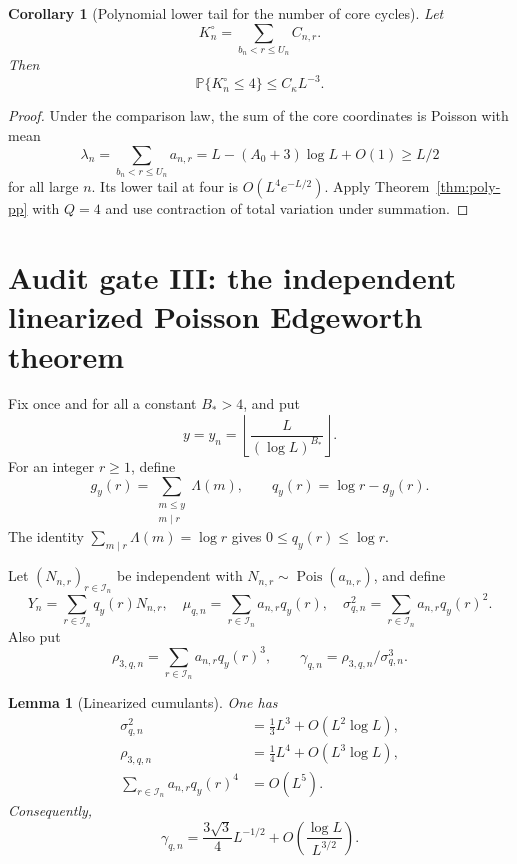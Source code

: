 \documentclass[11pt]{article}
\newtheorem{lemma}[theorem]{Lemma}
\newtheorem{corollary}[theorem]{Corollary}
\theoremstyle{remark}
\newcommand{\Pp}{\mathbb P}
\newcommand{\Pois}{\operatorname{Pois}}
\begin{document}
\begin{corollary}[Polynomial lower tail for the number of core cycles]
\label{cor:core-lower-tail}
Let
\[
 K_n^\circ=\sum_{b_n<r\le U_n}C_{n,r}.
\]
Then
\[
 \Pp\{K_n^\circ\le4\}\le C_\kappa L^{-3}.
\]
\end{corollary}

\begin{proof}
Under the comparison law, the sum of the core coordinates is Poisson with
mean
\[
 \lambda_n=\sum_{b_n<r\le U_n}a_{n,r}
 =L-(A_0+3)\log L+O(1)\ge L/2
\]
for all large $n$.  Its lower tail at four is $O(L^4e^{-L/2})$.  Apply
Theorem~\ref{thm:poly-pp} with $Q=4$ and use contraction of total variation
under summation.
\end{proof}

\section{Audit gate III: the independent linearized Poisson Edgeworth theorem}
\label{sec:poisson-edgeworth}

Fix once and for all a constant $B_*>4$, and put
\[
 y=y_n=\left\lfloor\frac{L}{(\log L)^{B_*}}\right\rfloor.
\]
For an integer $r\ge1$, define
\[
 g_y(r)=\sum_{\substack{m\le y\\m\mid r}}\Lambda(m),
 \qquad
 q_y(r)=\log r-g_y(r).
\]
The identity $\sum_{m\mid r}\Lambda(m)=\log r$ gives
$0\le q_y(r)\le\log r$.

Let $(N_{n,r})_{r\in\mathcal I_n}$ be independent with
$N_{n,r}\sim\Pois(a_{n,r})$, and define
\[
 Y_n=\sum_{r\in\mathcal I_n}q_y(r)N_{n,r},
 \quad
 \mu_{q,n}=\sum_{r\in\mathcal I_n}a_{n,r}q_y(r),
 \quad
 \sigma_{q,n}^2=\sum_{r\in\mathcal I_n}a_{n,r}q_y(r)^2.
\]
Also put
\[
 \rho_{3,q,n}=\sum_{r\in\mathcal I_n}a_{n,r}q_y(r)^3,
 \qquad
 \gamma_{q,n}=\rho_{3,q,n}/\sigma_{q,n}^3.
\]

\begin{lemma}[Linearized cumulants]
\label{lem:linearized-cumulants}
One has
\begin{align}
 \sigma_{q,n}^2&=\frac13L^3+O(L^2\log L),
 \label{eq:q-variance}\\
 \rho_{3,q,n}&=\frac14L^4+O(L^3\log L),
 \label{eq:q-third}\\
 \sum_{r\in\mathcal I_n}a_{n,r}q_y(r)^4&=O(L^5).
 \label{eq:q-fourth}
\end{align}
Consequently,
\begin{equation}
\label{eq:q-skewness}
 \gamma_{q,n}=\frac{3\sqrt3}{4}L^{-1/2}
 +O\!\left(\frac{\log L}{L^{3/2}}\right).
\end{equation}
\end{lemma}
\end{document}
